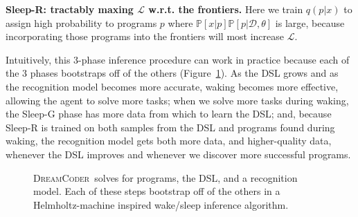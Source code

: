 \documentclass{article}
\newcommand{\system}{\textsc{DreamCoder}~}
\newcommand{\lowerBound}{\mathscr{L}}
\newcommand{\probability}{\mathds{P}} %
\begin{document}
\textbf{Sleep-R: tractably maxing $\lowerBound$ w.r.t. the
  frontiers.}  Here we train %
$q(p|x)$ to assign high probability to programs $p$ where
$\probability[x|p]\probability[p|\mathcal{D},\theta]$ is large, because incorporating those programs
into the frontiers will most increase $\lowerBound$.

Intuitively, this 3-phase inference procedure can work in practice because each of the 3 phases bootstraps off of the others (Figure~\ref{feeding}). As the DSL grows and as the recognition model becomes more accurate, waking becomes more effective, allowing the agent to solve more tasks; when we solve more tasks during waking,
the Sleep-G phase has more data from which to learn the DSL; and, because Sleep-R is trained on both
samples from the DSL and programs found during waking,
the recognition model gets both more data, and higher-quality data, whenever the DSL improves and whenever we discover more successful programs.
\begin{figure}\centering
  \caption{\system solves for programs, the DSL, and a recognition model. Each of these steps bootstrap off of the others in a Helmholtz-machine inspired wake/sleep inference algorithm.}  \label{feeding}
\end{figure}
\end{document}
